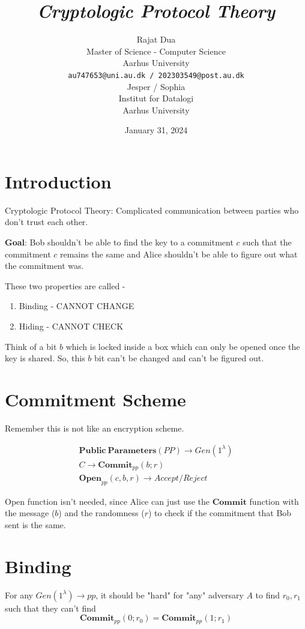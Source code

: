 \documentclass{article}
\title{\emph{Cryptologic Protocol Theory}}
\author{{\hspace{1mm}Rajat Dua} \\
	Master of Science - Computer Science\\
	Aarhus University\\
	\texttt{au747653@uni.au.dk / 202303549@post.au.dk} \\
	\And
	{\hspace{1mm}Jesper / Sophia} \\
	Institut for Datalogi\\
	Aarhus University\\
}
\date{January 31, 2024}
\begin{document}
\maketitle
\vspace{-1cm}

\section{Introduction}

Cryptologic Protocol Theory: Complicated communication between parties who don't trust each other.

\textbf{Goal}: Bob shouldn't be able to find the key to a commitment $c$ such that the commitment $c$ remains the same and Alice shouldn't be able to figure out what the commitment was.

These two properties are called -

\begin{enumerate}
    \item Binding - CANNOT CHANGE
    \item Hiding - CANNOT CHECK
\end{enumerate}

Think of a bit $b$ which is locked inside a box which can only be opened once the key is shared. So, this $b$ bit can't be changed and can't be figured out.

\section{Commitment Scheme}

Remember this is not like an encryption scheme.

\begin{align*}
    \mathbf{Public \: Parameters}(PP) \rightarrow Gen(1^{\lambda}) \\
    C \rightarrow \mathbf{Commit}_{pp}(b;r) \\
    \mathbf{Open}_{pp}(c,b,r) \rightarrow Accept/Reject
\end{align*}

Open function isn't needed, since Alice can just use the $\mathbf{Commit}$ function with the message ($b$) and the randomness ($r$) to check if the commitment that Bob sent is the same.

\section{Binding}

For any $Gen(1^{\lambda}) \rightarrow pp$, it should be "hard" for "any" adversary $A$ to find $r_0, r_1$ such that they can't find $$\mathbf{Commit}_{pp}(0;r_0) = \mathbf{Commit}_{pp}(1;r_1)$$
\end{document}
